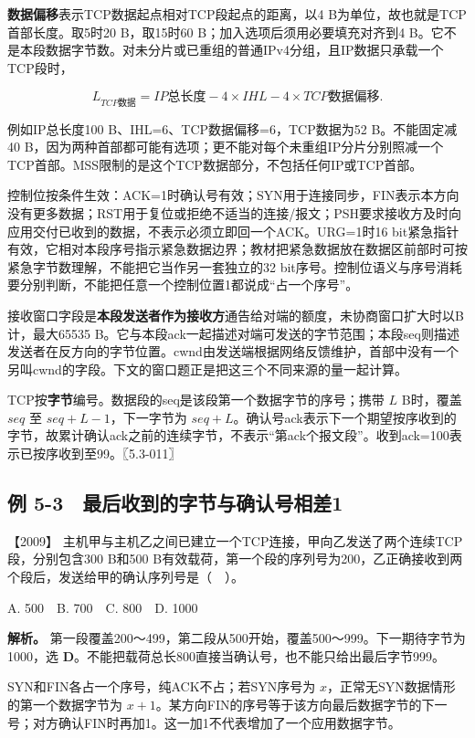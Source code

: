 \textbf{数据偏移}表示TCP数据起点相对TCP段起点的距离，以4 B为单位，故也就是TCP首部长度。取5时20 B，取15时60 B；加入选项后须用必要填充对齐到4 B。它不是本段数据字节数。对未分片或已重组的普通IPv4分组，且IP数据只承载一个TCP段时，

\[L_{TCP数据}=IP总长度-4\times IHL-4\times TCP数据偏移.\]

例如IP总长度100 B、IHL=6、TCP数据偏移=6，TCP数据为52 B。不能固定减40 B，因为两种首部都可能有选项；更不能对每个未重组IP分片分别照减一个TCP首部。MSS限制的是这个TCP数据部分，不包括任何IP或TCP首部。

控制位按条件生效：ACK=1时确认号有效；SYN用于连接同步，FIN表示本方向没有更多数据；RST用于复位或拒绝不适当的连接/报文；PSH要求接收方及时向应用交付已收到的数据，不表示必须立即回一个ACK。URG=1时16 bit紧急指针有效，它相对本段序号指示紧急数据边界；教材把紧急数据放在数据区前部时可按紧急字节数理解，不能把它当作另一套独立的32 bit序号。控制位语义与序号消耗要分别判断，不能把任意一个控制位置1都说成``占一个序号''。

接收窗口字段是\textbf{本段发送者作为接收方}通告给对端的额度，未协商窗口扩大时以B计，最大65535 B。它与本段ack一起描述对端可发送的字节范围；本段seq则描述发送者在反方向的字节位置。cwnd由发送端根据网络反馈维护，首部中没有一个另叫cwnd的字段。下文的窗口题正是把这三个不同来源的量一起计算。

TCP按\textbf{字节}编号。数据段的seq是该段第一个数据字节的序号；携带 \(L\) B时，覆盖 \(seq\) 至 \(seq+L-1\)，下一字节为 \(seq+L\)。确认号ack表示下一个期望按序收到的字节，故累计确认ack之前的连续字节，不表示``第ack个报文段''。收到ack=100表示已按序收到至99。〖5.3-011〗

\subsection{例 5-3　最后收到的字节与确认号相差1}\label{cn-ex5-3}

\noindent{}【2009】 主机甲与主机乙之间已建立一个TCP连接，甲向乙发送了两个连续TCP段，分别包含300 B和500 B有效载荷，第一个段的序列号为200，乙正确接收到两个段后，发送给甲的确认序列号是（　）。

A. 500　B. 700　C. 800　D. 1000


\textbf{解析。} 第一段覆盖200～499，第二段从500开始，覆盖500～999。下一期待字节为1000，选 \textbf{D}。不能把载荷总长800直接当确认号，也不能只给出最后字节999。

SYN和FIN各占一个序号，纯ACK不占；若SYN序号为 \(x\)，正常无SYN数据情形的第一个数据字节为 \(x+1\)。某方向FIN的序号等于该方向最后数据字节的下一号；对方确认FIN时再加1。这一加1不代表增加了一个应用数据字节。

